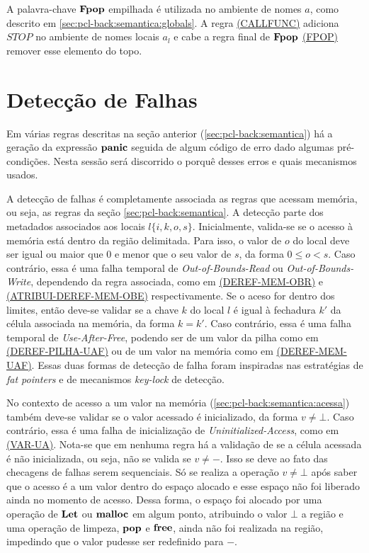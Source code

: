 
A palavra-chave $\mathbf{Fpop}$ empilhada é utilizada no ambiente de nomes $a$, como descrito em \ref{sec:pcl-back:semantica:globals}. A regra \hyperref[rule:callfunc]{(CALLFUNC)} adiciona $STOP$ no ambiente de nomes locais $a_l$ e cabe a regra final de $\mathbf{Fpop}$ \hyperref[rule:fpop]{(FPOP)} remover esse elemento do topo.

\section{Detecção de Falhas}
\label{sec:pcl-back:errors}

Em várias regras descritas na seção anterior (\ref{sec:pcl-back:semantica}) há a geração da expressão $\mathbf{panic}$ seguida de algum código de erro dado algumas pré-condições. Nesta sessão será discorrido o porquê desses erros e quais mecanismos usados. 

A detecção de falhas é completamente associada as regras que acessam memória, ou seja, as regras da seção \ref{sec:pcl-back:semantica}. A detecção parte dos metadados associados aos locais $l\{i, k, o, s\}$. Inicialmente, valida-se se o acesso à memória está dentro da região delimitada. Para isso, o valor de $o$ do local deve ser igual ou maior que 0 e menor que o seu valor de $s$, da forma $ 0 \le o < s$. Caso contrário, essa é uma falha temporal de \emph{Out-of-Bounds-Read} ou \emph{Out-of-Bounds-Write}, dependendo da regra associada, como em \hyperref[rule:deref-mem-obr]{(DEREF-MEM-OBR)} e \hyperref[rule:atribui-deref-mem-obe]{(ATRIBUI-DEREF-MEM-OBE)} respectivamente. Se o aceso for dentro dos limites, então deve-se validar se a chave $k$ do local $l$ é igual à fechadura $k'$ da célula associada na memória, da forma $k = k'$. Caso contrário, essa é uma falha temporal de \emph{Use-After-Free}, podendo ser de um valor da pilha como em \hyperref[rule:deref-pilha-uaf]{(DEREF-PILHA-UAF)} ou de um valor na memória como em \hyperref[rule:deref-mem-uaf]{(DEREF-MEM-UAF)}. Essas duas formas de detecção de falha foram inspiradas nas estratégias de \emph{fat pointers} e de mecanismos \emph{key-lock} de detecção.

No contexto de acesso a um valor na memória (\ref{sec:pcl-back:semantica:acessa}) também deve-se validar se o valor acessado é inicializado, da forma $v \neq \bot$. Caso contrário, essa é uma falha de inicialização de \emph{Uninitialized-Access}, como em \hyperref[rule:var-ua]{(VAR-UA)}. Nota-se que em nenhuma regra há a validação de se a célula acessada é não inicializada, ou seja, não se valida se $v \neq -$. Isso se deve ao fato das checagens de falhas serem sequenciais. Só se realiza a operação $v \neq \bot$ após saber que o acesso é a um valor dentro do espaço alocado e esse espaço não foi liberado ainda no momento de acesso. Dessa forma, o espaço foi alocado por uma operação de $\mathbf{Let}$ ou $\mathbf{malloc}$ em algum ponto, atribuindo o valor $\bot$ a região e uma operação de limpeza, $\mathbf{pop}$ e $\mathbf{free}$, ainda não foi realizada na região, impedindo que o valor pudesse ser redefinido para $-$.

